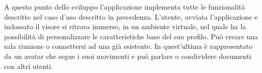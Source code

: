 A questo punto dello sviluppo l'applicazione implementa tutte le funzionalità descritte nel caso d'uso descritto in precedenza. L'utente, avviata l'applicazione e indossato il visore si ritrova immerso, in un ambiente virtuale, nel quale ha la possibilità di personalizzare le caratteristiche base del suo profilo. Può creare una sala riunione o connettersi ad una già esistente. In quest'ultima è rappresentato da un avatar che segue i suoi movimenti e può parlare o condividere documenti con altri utenti.









